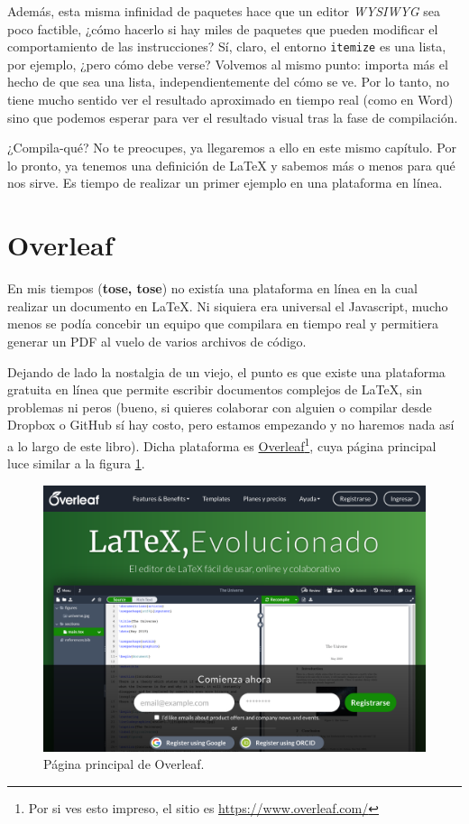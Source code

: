 Además, esta misma infinidad de paquetes hace que un editor \emph{WYSIWYG} sea poco factible, ¿cómo hacerlo si hay miles de paquetes que pueden modificar el comportamiento de las instrucciones? Sí, claro, el entorno \texttt{itemize} es una lista, por ejemplo, ¿pero cómo debe verse? Volvemos al mismo punto: importa más el hecho de que sea una lista, independientemente del cómo se ve. Por lo tanto, no tiene mucho sentido ver el resultado aproximado en tiempo real (como en Word) sino que podemos esperar para ver el resultado visual tras la fase de compilación.

¿Compila-qué? No te preocupes, ya llegaremos a ello en este mismo capítulo. Por lo pronto, ya tenemos una definición de \LaTeX{} y sabemos más o menos para qué nos sirve. Es tiempo de realizar un primer ejemplo en una plataforma en línea.



\section{Overleaf}
\label{sec:overleaf}



En mis tiempos (\textbf{tose, tose}) no existía una plataforma en línea en la cual realizar un documento en \LaTeX. Ni siquiera era universal el Javascript, mucho menos se podía concebir un equipo que compilara en tiempo real y permitiera generar un PDF al vuelo de varios archivos de código.

Dejando de lado la nostalgia de un viejo, el punto es que existe una plataforma gratuita en línea que permite escribir documentos complejos de \LaTeX{}, sin problemas ni peros (bueno, si quieres colaborar con alguien o compilar desde Dropbox o GitHub sí hay costo, pero estamos empezando y no haremos nada así a lo largo de este libro). Dicha plataforma es \href{https://www.overleaf.com/}{Overleaf}\footnote{Por si ves esto impreso, el sitio es \href{https://www.overleaf.com/}{https://www.overleaf.com/}}, cuya página principal luce similar a la figura \ref{fig:overleaf_home}.

\begin{figure}[ht!]
	\centering
	\includegraphics[width=\linewidth]{img/overleaf_300ppi.png}
	\caption{Página principal de Overleaf.}
	\label{fig:overleaf_home}
\end{figure}

